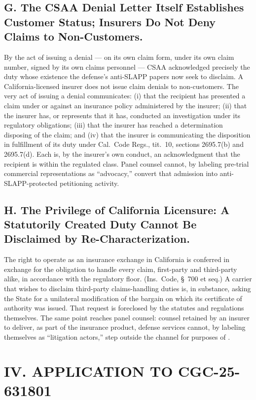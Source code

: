\subsection*{G. The CSAA Denial Letter Itself Establishes Customer Status; Insurers Do Not Deny Claims to Non-Customers.}

By the act of issuing a denial --- on its own claim form, under its own claim number, signed by its own claims personnel --- CSAA acknowledged precisely the duty whose existence the defense's anti-SLAPP papers now seek to disclaim. A California-licensed insurer does not issue claim denials to non-customers. The very act of issuing a denial communicates: (i) that the recipient has presented a claim under or against an insurance policy administered by the insurer; (ii) that the insurer has, or represents that it has, conducted an investigation under its regulatory obligations; (iii) that the insurer has reached a determination disposing of the claim; and (iv) that the insurer is communicating the disposition in fulfillment of its duty under Cal.\ Code Regs., tit.\ 10, sections 2695.7(b) and 2695.7(d). Each is, by the insurer's own conduct, an acknowledgment that the recipient is within the regulated class. Panel counsel cannot, by labeling pre-trial commercial representations as ``advocacy,'' convert that admission into anti-SLAPP-protected petitioning activity.

\subsection*{H. The Privilege of California Licensure: A Statutorily Created Duty Cannot Be Disclaimed by Re-Characterization.}

The right to operate as an insurance exchange in California is conferred in exchange for the obligation to handle every claim, first-party and third-party alike, in accordance with the regulatory floor. (Ins.\ Code, \S~700 et seq.) A carrier that wishes to disclaim third-party claims-handling duties is, in substance, asking the State for a unilateral modification of the bargain on which its certificate of authority was issued. That request is foreclosed by the statutes and regulations themselves. The same point reaches panel counsel: counsel retained by an insurer to deliver, as part of the insurance product, defense services cannot, by labeling themselves as ``litigation actors,'' step outside the channel for purposes of .

\section*{IV. APPLICATION TO CGC-25-631801}


